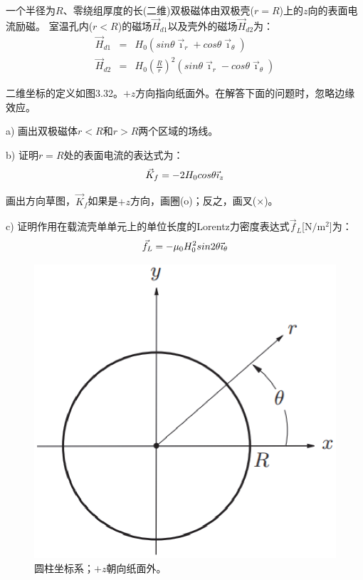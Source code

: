一个半径为$R$、零绕组厚度的长(二维)双极磁体由双极壳($r=R$)上的$z$向的表面电流励磁。
室温孔内($r<R$)的磁场$\vec{H}_{d1}$以及壳外的磁场$\vec{H}_{d2}$为：
\begin{eqnarray}
\vec{H}_{d1}&=&H_{0}(sin\theta\vec{\imath}_{r}+cos\theta\vec{\imath}_{\theta})\\%
\vec{H}_{d2}&=&H_{0}(\frac{R}{r})^2(sin\theta\vec{\imath}_{r}-cos\theta\vec{\imath}_{\theta})%
\end{eqnarray}

二维坐标的定义如图3.32。$+z$方向指向纸面外。在解答下面的问题时，忽略边缘效应。

a) 画出双极磁体$r<R$和$r>R$两个区域的场线。

b) 证明$r=R$处的表面电流的表达式为：
\begin{equation}
\vec{K}_{f}=-2H_{0}cos\theta\vec{\imath}_{z}\\%
\end{equation}

画出方向草图，$\vec{K}_f$如果是$+z$方向，画圈(o)；反之，画叉(×)。

c) 证明作用在载流壳单单元上的单位长度的Lorentz力密度表达式$\vec{f}_L$[$\mathrm{N/m^2}$]为：
\begin{equation}
\vec{f}_{L}=-\mu_{0}H_{0}^{2}sin2\theta\vec{\imath}_{\theta}\\%
\end{equation}

\begin{figure}[htbp]
	\centering
	\includegraphics[scale=0.5]{chpt3/figs/fig3.32.eps}
	\caption{圆柱坐标系；$+z$朝向纸面外。}
\end{figure}

